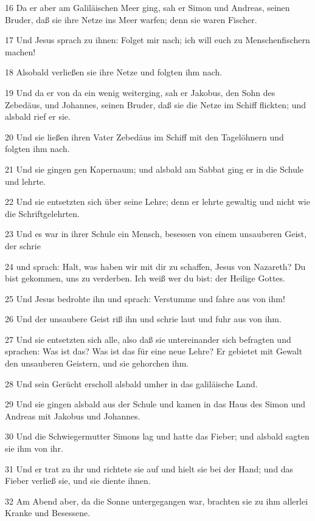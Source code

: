 \par 16 Da er aber am Galiläischen Meer ging, sah er Simon und Andreas, seinen Bruder, daß sie ihre Netze ins Meer warfen; denn sie waren Fischer.
\par 17 Und Jesus sprach zu ihnen: Folget mir nach; ich will euch zu Menschenfischern machen!
\par 18 Alsobald verließen sie ihre Netze und folgten ihm nach.
\par 19 Und da er von da ein wenig weiterging, sah er Jakobus, den Sohn des Zebedäus, und Johannes, seinen Bruder, daß sie die Netze im Schiff flickten; und alsbald rief er sie.
\par 20 Und sie ließen ihren Vater Zebedäus im Schiff mit den Tagelöhnern und folgten ihm nach.
\par 21 Und sie gingen gen Kapernaum; und alsbald am Sabbat ging er in die Schule und lehrte.
\par 22 Und sie entsetzten sich über seine Lehre; denn er lehrte gewaltig und nicht wie die Schriftgelehrten.
\par 23 Und es war in ihrer Schule ein Mensch, besessen von einem unsauberen Geist, der schrie
\par 24 und sprach: Halt, was haben wir mit dir zu schaffen, Jesus von Nazareth? Du bist gekommen, uns zu verderben. Ich weiß wer du bist: der Heilige Gottes.
\par 25 Und Jesus bedrohte ihn und sprach: Verstumme und fahre aus von ihm!
\par 26 Und der unsaubere Geist riß ihn und schrie laut und fuhr aus von ihm.
\par 27 Und sie entsetzten sich alle, also daß sie untereinander sich befragten und sprachen: Was ist das? Was ist das für eine neue Lehre? Er gebietet mit Gewalt den unsauberen Geistern, und sie gehorchen ihm.
\par 28 Und sein Gerücht erscholl alsbald umher in das galiläische Land.
\par 29 Und sie gingen alsbald aus der Schule und kamen in das Haus des Simon und Andreas mit Jakobus und Johannes.
\par 30 Und die Schwiegermutter Simons lag und hatte das Fieber; und alsbald sagten sie ihm von ihr.
\par 31 Und er trat zu ihr und richtete sie auf und hielt sie bei der Hand; und das Fieber verließ sie, und sie diente ihnen.
\par 32 Am Abend aber, da die Sonne untergegangen war, brachten sie zu ihm allerlei Kranke und Besessene.
